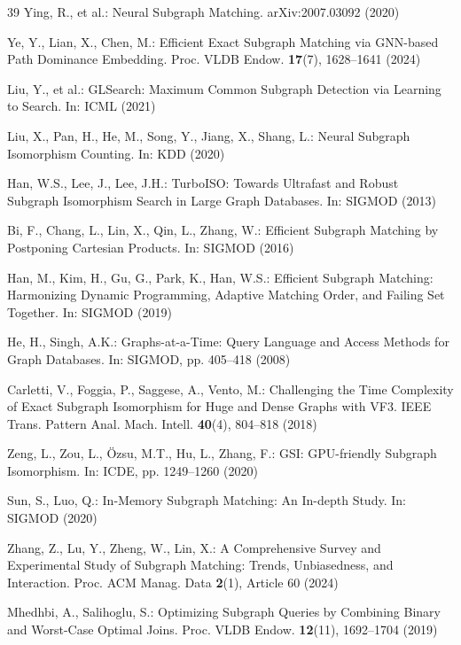 \documentclass[runningheads]{llncs}
\begin{document}
\begin{thebibliography}{39}
Ying, R., et al.: Neural Subgraph Matching. arXiv:2007.03092 (2020)

Ye, Y., Lian, X., Chen, M.: Efficient Exact Subgraph Matching via GNN-based Path Dominance Embedding. Proc. VLDB Endow. \textbf{17}(7), 1628--1641 (2024)

Liu, Y., et al.: GLSearch: Maximum Common Subgraph Detection via Learning to Search. In: ICML (2021)

Liu, X., Pan, H., He, M., Song, Y., Jiang, X., Shang, L.: Neural Subgraph Isomorphism Counting. In: KDD (2020)

Han, W.S., Lee, J., Lee, J.H.: TurboISO: Towards Ultrafast and Robust Subgraph Isomorphism Search in Large Graph Databases. In: SIGMOD (2013)

Bi, F., Chang, L., Lin, X., Qin, L., Zhang, W.: Efficient Subgraph Matching by Postponing Cartesian Products. In: SIGMOD (2016)

Han, M., Kim, H., Gu, G., Park, K., Han, W.S.: Efficient Subgraph Matching: Harmonizing Dynamic Programming, Adaptive Matching Order, and Failing Set Together. In: SIGMOD (2019)

He, H., Singh, A.K.: Graphs-at-a-Time: Query Language and Access Methods for Graph Databases. In: SIGMOD, pp. 405--418 (2008)

Carletti, V., Foggia, P., Saggese, A., Vento, M.: Challenging the Time Complexity of Exact Subgraph Isomorphism for Huge and Dense Graphs with VF3. IEEE Trans. Pattern Anal. Mach. Intell. \textbf{40}(4), 804--818 (2018)

Zeng, L., Zou, L., \"{O}zsu, M.T., Hu, L., Zhang, F.: GSI: GPU-friendly Subgraph Isomorphism. In: ICDE, pp. 1249--1260 (2020)

Sun, S., Luo, Q.: In-Memory Subgraph Matching: An In-depth Study. In: SIGMOD (2020)

Zhang, Z., Lu, Y., Zheng, W., Lin, X.: A Comprehensive Survey and Experimental Study of Subgraph Matching: Trends, Unbiasedness, and Interaction. Proc. ACM Manag. Data \textbf{2}(1), Article 60 (2024)

Mhedhbi, A., Salihoglu, S.: Optimizing Subgraph Queries by Combining Binary and Worst-Case Optimal Joins. Proc. VLDB Endow. \textbf{12}(11), 1692--1704 (2019)


\end{thebibliography}
\end{document}
